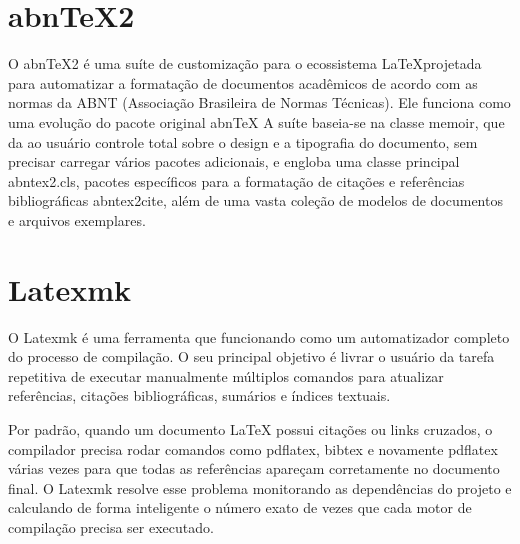\section{abnTeX2}
O abnTeX2 é uma suíte de customização para o ecossistema \LaTeX projetada para automatizar a formatação de documentos acadêmicos de acordo com as normas da ABNT (Associação Brasileira de Normas Técnicas). Ele funciona como uma evolução do pacote original abnTeX 
A suíte baseia-se na classe memoir, que da ao usuário controle total sobre o design e a tipografia do documento, sem precisar carregar vários pacotes adicionais, e engloba uma classe principal abntex2.cls, pacotes específicos para a formatação de citações e referências bibliográficas abntex2cite, além de uma vasta coleção de modelos de documentos e arquivos exemplares.

\section{Latexmk}

O Latexmk é uma ferramenta que funcionando como um automatizador completo do processo de compilação. O seu principal objetivo é livrar o usuário da tarefa repetitiva de executar manualmente múltiplos comandos para atualizar referências, citações bibliográficas, sumários e índices textuais.

Por padrão, quando um documento LaTeX possui citações ou links cruzados, o compilador precisa rodar comandos como pdflatex, bibtex e novamente pdflatex várias vezes para que todas as referências apareçam corretamente no documento final. O Latexmk resolve esse problema monitorando as dependências do projeto e calculando de forma inteligente o número exato de vezes que cada motor de compilação precisa ser executado.
